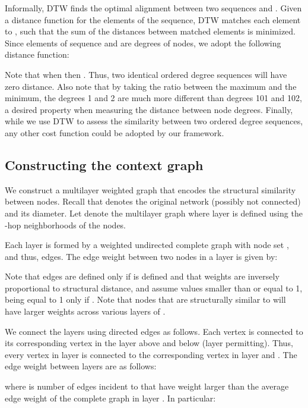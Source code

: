 \documentclass[sigconf]{acmart}
\begin{document}
Informally, DTW finds the optimal alignment between two sequences  and . Given a distance function  for the elements of the sequence, DTW matches each element  to , such that the sum of the distances between matched elements is minimized. 
Since elements of sequence  and  are degrees of nodes, we adopt the following distance function:

Note that when  then . Thus, two identical ordered degree sequences will have zero distance. Also note that by taking the ratio between the maximum and the minimum, the degrees 1 and 2 are much more different than degrees 101 and 102, a desired property when measuring the distance between node degrees. Finally, while we use DTW to assess the similarity between two ordered degree sequences, any other cost function could be adopted by our framework. 








\subsection{Constructing the context graph}
\label{sec:distancegraph}

We construct a multilayer weighted graph that encodes the structural similarity between nodes. Recall that  denotes the original network (possibly not connected) and  its diameter. Let  denote the multilayer graph where layer  is defined using the -hop neighborhoods of the nodes.

Each layer  is formed by a weighted undirected complete graph with node set , and thus,  edges. The edge weight between two nodes in a layer is given by: 

Note that edges are defined only if  is defined and that weights are inversely proportional to structural distance, and assume values smaller than or equal to 1, being equal to 1 only if . Note that nodes that are structurally similar to  will have larger weights across various layers of . 

We connect the layers using directed edges as follows. Each vertex is connected to its corresponding vertex in the layer above and below (layer permitting). Thus, every vertex  in layer  is connected to the corresponding vertex  in layer  and . The edge weight between layers are as follows:

where  is number of edges incident to  that have weight larger than the average edge weight of the complete graph in layer . In particular:
\end{document}
